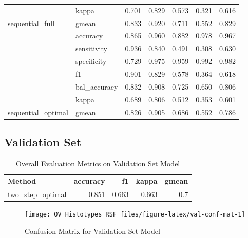 \documentclass[
]{report}
\begin{document}
\begin{table}
\begin{tabular}[t]{l|l|r|r|r|r|r}
\cline{2-7}
 & kappa & 0.701 & 0.829 & 0.573 & 0.321 & 0.616\\
\cline{2-7}
\multirow{-7}{*}{\raggedright\arraybackslash sequential\_full} & gmean & 0.833 & 0.920 & 0.711 & 0.552 & 0.829\\
\cline{1-7}
 & accuracy & 0.865 & 0.960 & 0.882 & 0.978 & 0.967\\
\cline{2-7}
 & sensitivity & 0.936 & 0.840 & 0.491 & 0.308 & 0.630\\
\cline{2-7}
 & specificity & 0.729 & 0.975 & 0.959 & 0.992 & 0.982\\
\cline{2-7}
 & f1 & 0.901 & 0.829 & 0.578 & 0.364 & 0.618\\
\cline{2-7}
 & bal\_accuracy & 0.832 & 0.908 & 0.725 & 0.650 & 0.806\\
\cline{2-7}
 & kappa & 0.689 & 0.806 & 0.512 & 0.353 & 0.601\\
\cline{2-7}
\multirow{-7}{*}{\raggedright\arraybackslash sequential\_optimal} & gmean & 0.826 & 0.905 & 0.686 & 0.552 & 0.786\\
\hline
\end{tabular}
\end{table}

\hypertarget{validation-set}{%
\subsection{Validation Set}\label{validation-set}}

\begin{table}

\caption{\label{tab:val-eval-overall}Overall Evaluation Metrics on Validation Set Model}
\centering
\begin{tabular}[t]{l|r|r|r|r}
\hline
Method & accuracy & f1 & kappa & gmean\\
\hline
two\_step\_optimal & 0.851 & 0.663 & 0.663 & 0.7\\
\hline
\end{tabular}
\end{table}

\begin{figure}[H]

{\centering \texttt{[image: OV\_Histotypes\_RSF\_files/figure-latex/val-conf-mat-1]} 

}

\caption{Confusion Matrix for Validation Set Model}\label{fig:val-conf-mat}
\end{figure}
\end{document}
